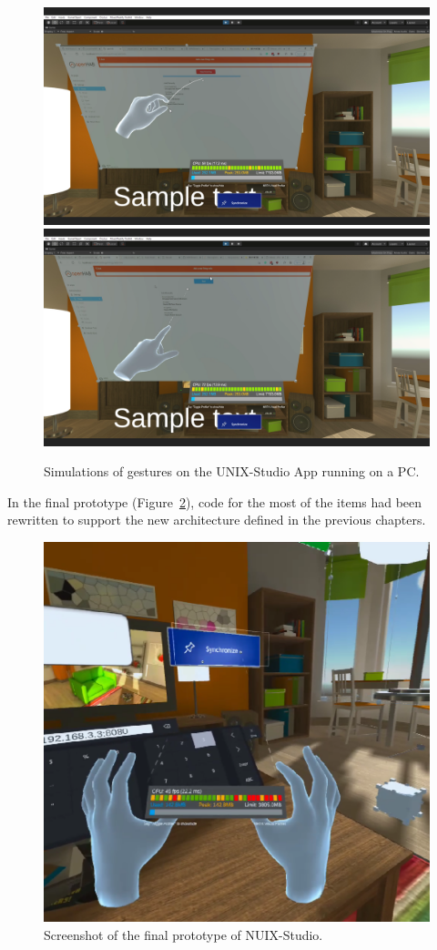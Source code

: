 \begin{figure}
  \centering
    {\includegraphics[width=0.45\linewidth]{figures/InputSimulation1.png}}
    {\includegraphics[width=0.45\linewidth]{figures/InputSimulation2.png}}
  \caption{Simulations of gestures on the UNIX-Studio App running on a PC.}
  \label{fig:InputSimulation-figure}
\end{figure}

In the final prototype (Figure~\ref{fig:FinalPrototype-figure}), code for the most of the items had been rewritten to support the new architecture defined in the previous chapters. 


\begin{figure}
  \centering
  \includegraphics[width=0.6\linewidth]{figures/FinalPrototype.png}
  \caption{Screenshot of the final prototype of NUIX-Studio.}
  \label{fig:FinalPrototype-figure}
\end{figure}